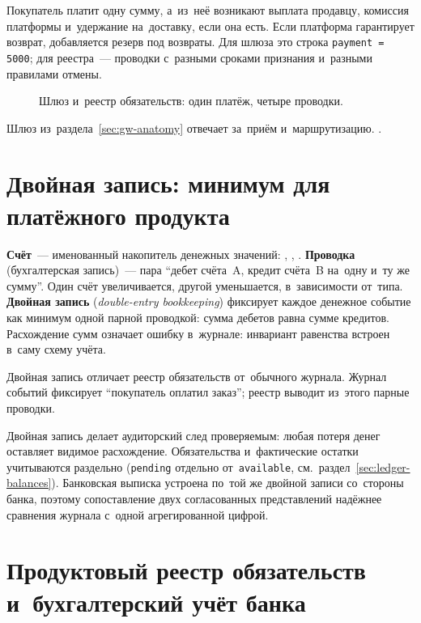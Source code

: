 Покупатель платит одну сумму, а~из~неё возникают выплата продавцу, комиссия платформы и~удержание
на~доставку, если она есть. Если платформа гарантирует возврат, добавляется
резерв под возвраты.
Для шлюза это строка \texttt{payment = 5000}; для реестра~--- проводки
с~разными сроками признания и~разными правилами отмены.

\begin{figure}[tbp]
  \centering
  \caption{Шлюз и~реестр обязательств: один платёж, четыре проводки.}\label{fig:gateway-vs-ledger}
\end{figure}

Шлюз из~раздела~\ref{sec:gw-anatomy} отвечает за~приём и~маршрутизацию.
.

\section{Двойная запись: минимум для платёжного продукта}\label{sec:ledger-double-entry}

\textbf{Счёт}~--- именованный накопитель денежных значений:
\mbox{}, ,
. \textbf{Проводка} (бухгалтерская запись)~---
пара \enquote{дебет счёта~A, кредит счёта~B на~одну и~ту же сумму}. Один счёт
увеличивается, другой уменьшается, в~зависимости от~типа. \textbf{Двойная
запись} (\textit{double-entry bookkeeping}) фиксирует каждое денежное событие как
минимум одной парной проводкой: сумма дебетов равна сумме кредитов.
Расхождение сумм означает ошибку в~журнале: инвариант равенства встроен в~саму
схему учёта.

Двойная запись отличает реестр обязательств от~обычного журнала. Журнал событий
фиксирует \enquote{покупатель оплатил заказ}; реестр выводит из~этого парные
проводки.

Двойная запись делает аудиторский след проверяемым: любая потеря денег
оставляет видимое расхождение. Обязательства и~фактические остатки
учитываются раздельно (\texttt{pending} отдельно от~\texttt{available},
см.~раздел~\ref{sec:ledger-balances}). Банковская выписка устроена по~той же
двойной записи со~стороны банка, поэтому сопоставление двух согласованных
представлений надёжнее сравнения журнала с~одной агрегированной цифрой.

\section{Продуктовый реестр обязательств и~бухгалтерский учёт банка}\label{sec:ledger-vs-accounting}


